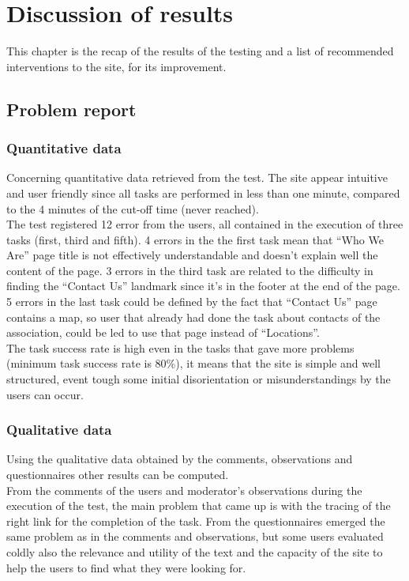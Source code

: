 %
%
\chapter{Discussion of results}
This chapter is the recap of the results of the testing and a list of recommended interventions to the site, for its improvement.

\section{Problem report}

\subsection{Quantitative data}
Concerning quantitative data retrieved from the test. The site appear intuitive and user friendly since all tasks are performed in less than one minute, compared to the 4 minutes of the cut-off time (never reached).\\
The test registered 12 error from the users, all contained in the execution of three tasks (first, third and fifth). 4 errors in the the first task mean that ``Who We Are'' page title is not effectively understandable and doesn't explain well the content of the page. 3 errors in the third task are related to the difficulty in finding the ``Contact Us'' landmark since it's in the footer at the end of the page. 5 errors in the last task could be defined by the fact that ``Contact Us'' page contains a map, so user that already had done the task about contacts of the association, could be led to use that page instead of ``Locations''.\\
The task success rate is high even in the tasks that gave more problems (minimum task success rate is 80\%), it means that the site is simple and well structured, event tough some initial disorientation or misunderstandings by the users can occur.

\subsection{Qualitative data}
Using the qualitative data obtained by the comments, observations and questionnaires other results can be computed.\\
From the comments of the users and moderator's observations during the execution of the test, the main problem that came up is with the tracing of the right link for the completion of the task.
From the questionnaires emerged the same problem as in the comments and observations, but some users evaluated coldly also the relevance and utility of the text and the capacity of the site to help the users to find what they were looking for.

